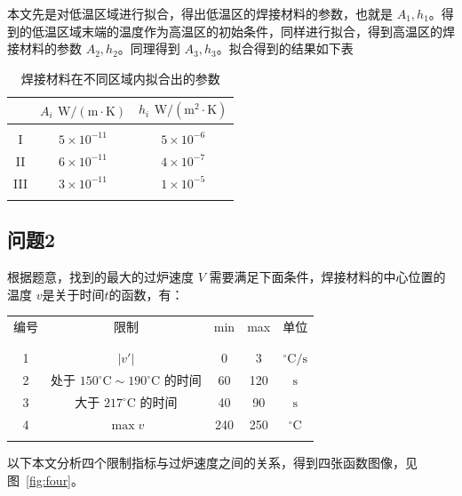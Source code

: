 \documentclass[../main.tex]{subfiles}
\begin{document}
本文先是对低温区域进行拟合，得出低温区的焊接材料的参数，也就是 \(A_{1}, h_{1}\)。得到的低温区域末端的温度作为高温区的初始条件，同样进行拟合，得到高温区的焊接材料的参数 \(A_{2}, h_{2}\)。同理得到 \(A_{3}, h_{3}\)。拟合得到的结果如下表
\begin{table}[H]
\centering
\begin{tabular}{ccc}
& \(A_{i}\) \(\mathrm{W}/ (\mathrm{m}\cdot \mathrm{K})\) & \(h_{i}\) \(\mathrm{W} / (\mathrm{m}^{2} \cdot \mathrm{K})\) \\ \hline \hline
\\[-1em]
I & \(5 \times 10 ^{-11}\) & \(5 \times 10 ^{-6}\) \\ 
II & \(6 \times 10 ^{-11}\) & \(4 \times 10 ^{-7}\) \\
III & \(3 \times 10 ^{-11}\) & \(1 \times 10 ^{-5}\) 
\\[-1em]
\\ \hline
\end{tabular}\caption{焊接材料在不同区域内拟合出的参数}
\end{table}

\subsection{问题2}
根据题意，找到的最大的过炉速度 \(V\) 需要满足下面条件，焊接材料的中心位置的温度 \(v\)是关于时间\(t\)的函数，有：

\begin{table}[H]
\centering
\begin{tabular}{ccccc}
编号&限制 & min & max 	& 单位
\\ [-1em]
\\ \hline \hline
\\ [-1em]
1&\(\vert v '\vert\) & 0 & 3 & \(^{\circ}\mathrm{C} / \mathrm{s}\)\\
2&处于 \(150 ^{\circ}\mathrm{C}\sim 190 ^{\circ}\mathrm{C}\) 的时间 & 60 & 120 & \(\mathrm{s}\)\\
3&大于 \(217 ^{\circ}\mathrm{C}\) 的时间 & 40 & 90 & \(\mathrm{s}\)\\
4&\(\max {v}\) & 240 & 250 & \(^{\circ}\mathrm{C}\) 
\\ [-1em]
\\ \hline
\end{tabular}
\end{table}
以下本文分析四个限制指标与过炉速度之间的关系，得到四张函数图像，见图~\ref{fig:four}。
\end{document}
